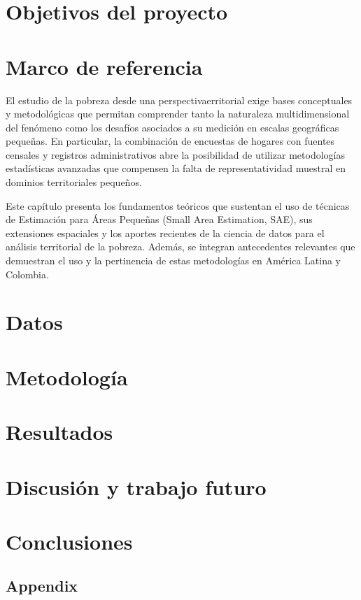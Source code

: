 \documentclass{unipd-thesis-modern} %
\begin{document}
    
    \newpage
    
    \chapter{Objetivos del proyecto} %
    
    
    \chapter{Marco de referencia}
El estudio de la pobreza desde una perspectivaerritorial exige bases conceptuales y metodológicas que permitan comprender tanto la naturaleza multidimensional del fenómeno como los desafíos asociados a su medición en escalas geográficas pequeñas. En particular, la combinación de encuestas de hogares con fuentes censales y registros administrativos abre la posibilidad de utilizar metodologías estadísticas avanzadas que compensen la falta de representatividad muestral en dominios territoriales pequeños.

Este capítulo presenta los fundamentos teóricos que sustentan el uso de técnicas de Estimación para Áreas Pequeñas (Small Area Estimation, SAE), sus extensiones espaciales y los aportes recientes de la ciencia de datos para el análisis territorial de la pobreza. Además, se integran antecedentes relevantes que demuestran el uso y la pertinencia de estas metodologías en América Latina y Colombia.
    
    
    \chapter{Datos}
        
    \chapter{Metodología}
        
     \chapter{Resultados}
     
    \chapter{Discusión y trabajo futuro}
    
    \chapter{Conclusiones}
    
    \clearpage
    \printbibliography
     \begin{appendices}
    \chapter{Appendix}
        
    \end{appendices}
\end{document}
